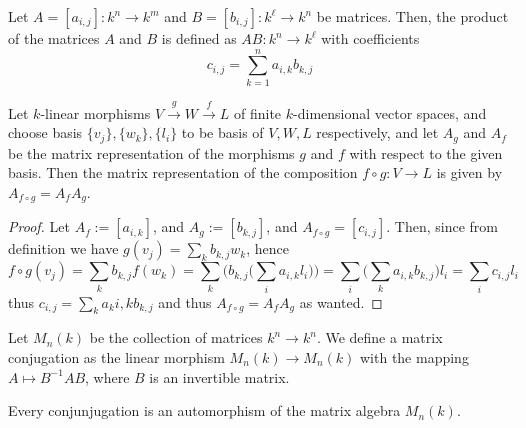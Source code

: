 \begin{definition}\label{def: matrix multiplication}
  Let \(A = [a_{i,j}] : k^n \to k^m\) and \(B = [b_{i, j}] : k^\ell \to k^n\) be
  matrices. Then, the product of the matrices \(A\) and \(B\) is defined as
  \(AB : k^n \to k^\ell\) with coefficients
  \[
    c_{i, j} = \sum_{k=1}^n a_{i, k} b_{k, j}
  \] 
\end{definition}

\begin{proposition}
  \label{prop: matrix of the composition}
  Let \(k\)-linear morphisms \(V \xrightarrow g W \xrightarrow f L\) of finite
  \(k\)-dimensional vector spaces, and choose basis \(\{v_j\}, \{w_k\}, \{l_i\}\)
  to be basis of \(V, W, L\) respectively, and let \(A_g\) and \(A_f\) be the
  matrix representation of the morphisms \(g\) and \(f\) with respect to the
  given basis. Then the matrix representation of the composition \(f \circ g: V
  \to L\) is given by \(A_{f \circ g} = A_f A_g\).
\end{proposition}

\begin{proof}
  Let \(A_f := [a_{i, k}]\), and \(A_g := [b_{k, j}]\), and \(A_{f \circ g} =
  [c_{i, j}]\). Then, since from definition we have \(g(v_j) = \sum_k b_{k, j}
  w_k\), hence 
  \[
    f \circ g(v_j) =
    \sum_k b_{k, j} f(w_k) =
    \sum_k \bigg( b_{k, j} \bigg( \sum_i a_{i, k} l_i \bigg) \bigg) 
    = \sum_i \bigg( \sum_k a_{i, k} b_{k, j} \bigg) l_i 
    = \sum_i c_{i, j} l_i 
  \]
  thus \(c_{i, j} = \sum_k a_k{i, k} b_{k, j}\) and thus \(A_{f \circ g} = A_f
  A_g\) as wanted.
\end{proof}

\begin{definition}[Conjugation]\label{def: matrix conjugation}
  Let \(M_n(k)\) be the collection of matrices \(k^n \to k^n\). We define a
  matrix conjugation as the linear morphism \(M_n(k) \to M_n(k)\) with the
  mapping \(A \mapsto B^{-1} A B\), where \(B\) is an invertible matrix.
\end{definition}

\begin{proposition}
  Every conjunjugation is an automorphism of the matrix algebra \(M_n(k)\).
\end{proposition}
